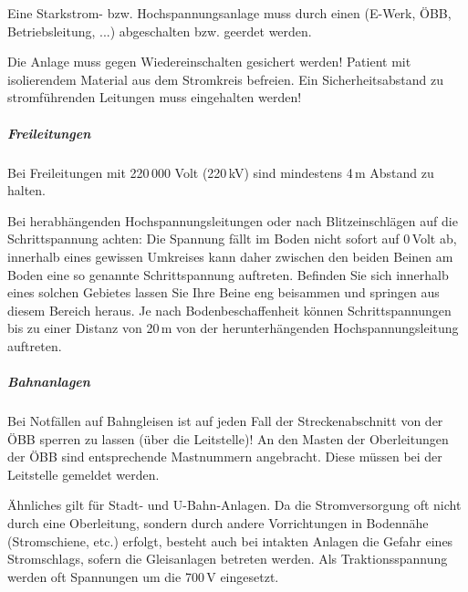 {
\label{topic:gefahrenbereich-strom}

Eine Starkstrom- bzw. Hochspannungsanlage muss durch einen 
(E-Werk, ÖBB, Betriebsleitung, ...) abgeschalten bzw. geerdet werden. 

Die Anlage muss
gegen Wiedereinschalten gesichert werden! Patient mit isolierendem
Material aus dem Stromkreis befreien. Ein Sicherheitsabstand zu
stromführenden Leitungen muss eingehalten werden! 



\subparagraph{Freileitungen}

Bei Freileitungen mit
220\,000 Volt (220\,kV) sind mindestens 4\,m Abstand zu halten.
\cite{Jaros1} 

Bei herabhängenden Hochspannungsleitungen oder
nach Blitzeinschlägen auf die Schrittspannung achten: Die
Spannung fällt im Boden nicht sofort auf 0\,Volt ab, innerhalb
eines gewissen Umkreises kann daher zwischen den beiden
Beinen am Boden eine so genannte Schrittspannung auftreten.
Befinden Sie sich innerhalb eines solchen Gebietes lassen Sie
Ihre Beine eng beisammen und springen aus diesem Bereich
heraus. Je nach Bodenbeschaffenheit können Schrittspannungen
bis zu einer Distanz von 20\,m von der herunterhängenden
Hochspannungsleitung auftreten. \cite{RedelsteinerHRNS1} 

\subparagraph{Bahnanlagen}
Bei
Notfällen auf Bahngleisen ist auf jeden Fall der
Streckenabschnitt von der ÖBB sperren zu lassen (über die
Leitstelle)! An den Masten der Oberleitungen der ÖBB sind
entsprechende Mastnummern angebracht. Diese müssen bei der Leitstelle gemeldet
werden. 

Ähnliches gilt für Stadt- und U-Bahn-Anlagen. Da die Stromversorgung oft nicht
durch eine Oberleitung, sondern durch andere Vorrichtungen in
Bodennähe (Stromschiene, etc.) erfolgt, besteht auch bei intakten Anlagen die
Gefahr eines Stromschlags, sofern die Gleisanlagen betreten werden. Als
Traktionsspannung werden oft Spannungen um die 700\,V eingesetzt. \cite{U61989}
}{

}{}{}{}


